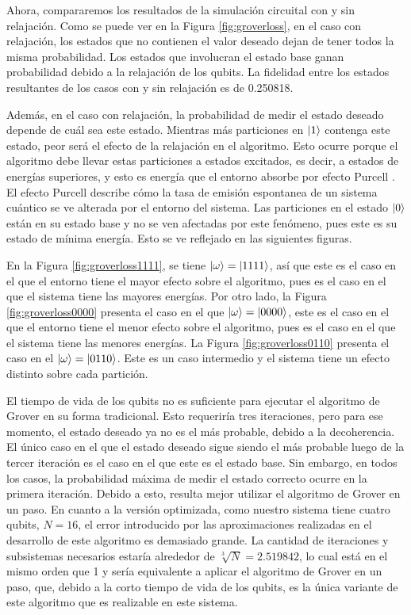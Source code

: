 Ahora, compararemos los resultados de la simulación circuital con y sin relajación. Como se puede ver en la Figura \ref{fig:groverloss}, en el caso con relajación, los estados que no contienen el valor deseado dejan de tener todos la misma probabilidad. Los estados que involucran el estado base ganan probabilidad debido a la relajación de los qubits. La fidelidad entre los estados resultantes de los casos con y sin relajación es de 0.250818.

Además, en el caso con relajación, la probabilidad de medir el estado deseado depende de cuál sea este estado. Mientras más particiones en $\ket{1}$ contenga este estado, peor será el efecto de la relajación en el algoritmo. Esto ocurre porque el algoritmo debe llevar estas particiones a estados excitados, es decir, a estados de energías superiores, y esto es energía que el entorno absorbe por efecto Purcell \cite{Haroche_1989}. El efecto Purcell describe cómo la tasa de emisión espontanea de un sistema cuántico se ve alterada por el entorno del sistema. Las particiones en el estado $\ket{0}$ están en su estado base y no se ven afectadas por este fenómeno, pues este es su estado de mínima energía. Esto se ve reflejado en las siguientes figuras.

En la Figura \ref{fig:groverloss1111}, se tiene $\ket{\omega} = \ket{1111}$, así que este es el caso en el que el entorno tiene el mayor efecto sobre el algoritmo, pues es el caso en el que el sistema tiene las mayores energías. Por otro lado, la Figura \ref{fig:groverloss0000} presenta el caso en el que $\ket{\omega} = \ket{0000}$, este es el caso en el que el entorno tiene el menor efecto sobre el algoritmo, pues es el caso en el que el sistema tiene las menores energías. La Figura \ref{fig:groverloss0110} presenta el caso en el $\ket{\omega} = \ket{0110}$. Este es un caso intermedio y el sistema tiene un efecto distinto sobre cada partición.

El tiempo de vida de los qubits no es suficiente para ejecutar el algoritmo de Grover en su forma tradicional. Esto requeriría tres iteraciones, pero para ese momento, el estado deseado ya no es el más probable, debido a la decoherencia. El único caso en el que el estado deseado sigue siendo el más probable luego de la tercer iteración es el caso en el que este es el estado base. Sin embargo, en todos los casos, la probabilidad máxima de medir el estado correcto ocurre en la primera iteración. Debido a esto, resulta mejor utilizar el algoritmo de Grover en un paso. En cuanto a la versión optimizada, como nuestro sistema tiene cuatro qubits, $N = 16$, el error introducido por las aproximaciones realizadas en el desarrollo de este algoritmo es demasiado grande. La cantidad de iteraciones y subsistemas necesarios estaría alrededor de $\sqrt[3]{N} = 2.519842$, lo cual está en el mismo orden que 1 y sería equivalente a aplicar el algoritmo de Grover en un paso, que, debido a la corto tiempo de vida de los qubits, es la única variante de este algoritmo que es realizable en este sistema.

